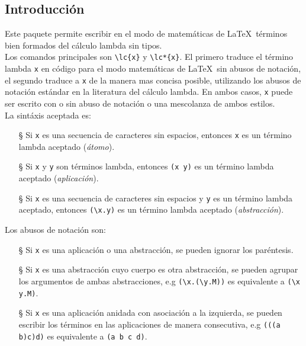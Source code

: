 \documentclass[12pt]{article}
\begin{document}
\begin{center}
  {\Huge \TeXLaMbDa}
\end{center}

\subsection*{Introducción}
Este paquete permite escribir en el modo de matemáticas de \LaTeX\ términos bien formados del cálculo lambda sin tipos.\\

Los comandos principales son \texttt{\textbackslash lc\{x\}} y \texttt{\textbackslash lc*\{x\}}. El primero traduce el término lambda \texttt{x} en código para el modo matemáticas de \LaTeX\ sin abusos de notación, el segundo traduce a \texttt{x} de la manera mas concisa posible, utilizando los abusos de notación estándar en la literatura del cálculo lambda. En ambos casos, \texttt{x} puede ser escrito con o sin abuso de notación o una mescolanza de ambos estilos.\\

La sintáxis aceptada es:
\begin{itemize}
\item[\S] Si \texttt{x} es una secuencia de caracteres sin espacios, entonces \texttt{x} es un término lambda aceptado (\emph{átomo}).

\item[\S] Si \texttt{x} y \texttt{y} son términos lambda, entonces \texttt{(x y)} es un término lambda aceptado (\emph{aplicación}).

\item[\S] Si \texttt{x} es una secuencia de caracteres sin espacios y \texttt{y} es un término lambda aceptado, entonces \texttt{(\textbackslash x.y)} es un término lambda aceptado (\emph{abstracción}).
\end{itemize}

Los abusos de notación son:
\begin{itemize}
\item[\S] Si \texttt{x} es una aplicación o una abstracción, se pueden ignorar los paréntesis.
\item[\S] Si \texttt{x} es una abstracción cuyo cuerpo es otra abstracción, se pueden agrupar los argumentos de ambas abstracciones, e.g \texttt{(\textbackslash x.(\textbackslash y.M))} es equivalente a \texttt{(\textbackslash x y.M)}.
\item[\S] Si \texttt{x} es una aplicación anidada con asociación a la izquierda, se pueden escribir los términos en las aplicaciones de manera consecutiva, e.g \texttt{(((a b)c)d)} es equivalente a \texttt{(a b c d)}.
\end{itemize}
\end{document}
